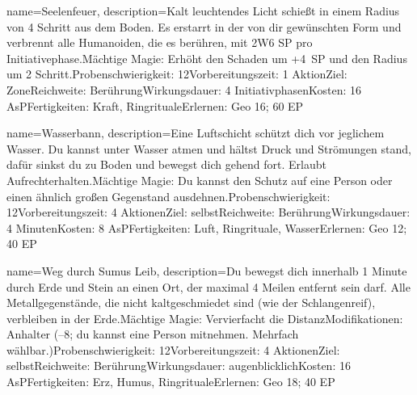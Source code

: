 {
    name={Seelenfeuer},
    description={Kalt leuchtendes Licht schießt in einem Radius von 4 Schritt aus dem Boden. Es erstarrt in der von dir gewünschten Form und verbrennt alle Humanoiden, die es berühren, mit 2W6 SP pro Initiativephase.\newline Mächtige Magie: Erhöht den Schaden um +4 SP und den Radius um 2 Schritt.\newline Probenschwierigkeit: 12\newline Vorbereitungszeit: 1 Aktion\newline Ziel: Zone\newline Reichweite: Berührung\newline Wirkungsdauer: 4 Initiativphasen\newline Kosten: 16 AsP\newline Fertigkeiten: Kraft, Ringrituale\newline Erlernen: Geo 16; 60 EP}
}


{
    name={Wasserbann},
    description={Eine Luftschicht schützt dich vor jeglichem Wasser. Du kannst unter Wasser atmen und hältst Druck und Strömungen stand, dafür sinkst du zu Boden und bewegst dich gehend fort. Erlaubt Aufrechterhalten.\newline Mächtige Magie: Du kannst den Schutz auf eine Person oder einen ähnlich großen Gegenstand ausdehnen.\newline Probenschwierigkeit: 12\newline Vorbereitungszeit: 4 Aktionen\newline Ziel: selbst\newline Reichweite: Berührung\newline Wirkungsdauer: 4 Minuten\newline Kosten: 8 AsP\newline Fertigkeiten: Luft, Ringrituale, Wasser\newline Erlernen: Geo 12; 40 EP}
}


{
    name={Weg durch Sumus Leib},
    description={Du bewegst dich innerhalb 1 Minute durch Erde und Stein an einen Ort, der maximal 4 Meilen entfernt sein darf. Alle Metallgegenstände, die nicht kaltgeschmiedet sind (wie der Schlangenreif), verbleiben in der Erde.\newline Mächtige Magie: Vervierfacht die Distanz\newline Modifikationen: Anhalter (–8; du kannst eine Person mitnehmen. Mehrfach wählbar.)\newline Probenschwierigkeit: 12\newline Vorbereitungszeit: 4 Aktionen\newline Ziel: selbst\newline Reichweite: Berührung\newline Wirkungsdauer: augenblicklich\newline Kosten: 16 AsP\newline Fertigkeiten: Erz, Humus, Ringrituale\newline Erlernen: Geo 18; 40 EP}
}


